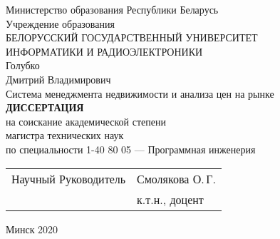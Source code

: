 \begin{titlepage}
  \begin{center}
    Министерство образования Республики Беларусь\\[1em]
    Учреждение образования\\
    БЕЛОРУССКИЙ ГОСУДАРСТВЕННЫЙ УНИВЕРСИТЕТ \\
    ИНФОРМАТИКИ И РАДИОЭЛЕКТРОНИКИ\\[7em]


    {Голубко}\\
    {Дмитрий Владимирович}\\[1em]

    {Система менеджмента недвижимости и анализа цен на рынке}\\[5em]

    \textbf{ДИССЕРТАЦИЯ}\\
    {на соискание академической степени}\\
    {магистра технических наук}\\[1em]

    {по специальности 1-40 80 05 — Программная инженерия}\\[7em]

    \begin{tabular}{ p{}p{} }
      Научный Руководитель & Смолякова О.\,Г. \\
       & к.т.н., доцент\\
    \end{tabular}
    
    \vfill
    {\normalsize Минск 2020}
  \end{center}
\end{titlepage}
